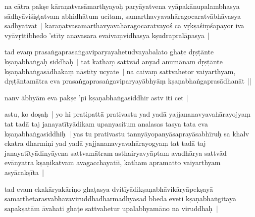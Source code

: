 \documentclass[article,12pt,a4paper]{memoir}%
\newcounter{parCount}
\begin{document}
	  
	  \pstart \leavevmode%
	\label{thakur75-69.24}na cātra pakṣe kāraṇatvasāmarthyayoḥ paryāyatvena vyāpakānupalambhasya sādhyāviśiṣṭatvam abhidhātum ucitam, samarthavyavahāragocaratvābhāvasya sādhyatvāt | kāraṇatvasamarthavyavahāragocaratvayoś ca vṛkṣaśiṃśapayor iva vyāvṛttibhedo 'stīty anavasara evaivaṃvidhasya kṣudrapralāpasya |
	{}
	\pend%
      

	  
	  \pstart \leavevmode%
	\label{thakur75-69.28}tad evaṃ prasaṅgaprasaṅgaviparyayahetudvayabalato ghaṭe dṛṣṭānte kṣaṇabhaṅgaḥ siddhaḥ | tat kathaṃ sattvād anyad anumānam dṛṣṭānte kṣaṇabhaṅgasādhakaṃ nāstīty ucyate | na caivaṃ sattvahetor vaiyarthyam, dṛṣṭāntamātra eva prasaṅgaprasaṅgaviparyayābhyāṃ kṣaṇabhaṅgaprasādhanāt ||
	{}
	\pend%
      

	  
	  \pstart \leavevmode%
	\label{thakur75-70.1}nanv ābhyām eva pakṣe 'pi kṣaṇabhaṅgasiddhir astv iti cet | 
	{}
	\pend%
      

	  
	  \pstart \leavevmode%
	\label{thakur75-70.1a}astu, ko doṣaḥ | yo hi pratipattā prativastu yad yadā yajjananavyavahārayojyaṃ tat tadā taj janayatītyādikam upanyasitum analasas tasya tata eva kṣaṇabhaṅgasiddhiḥ | yas tu prativastu tannyāyopanyāsaprayāsabhīruḥ sa khalv ekatra dharmiṇi yad yadā yajjananavyavahārayogyaṃ tat tadā taj janayatītyādinyāyena sattvamātram asthairyavyāptam avadhārya sattvād evānyatra kṣaṇikatvam avagacchayatīi, katham apramatto vaiyarthyam asyācakṣīta |
	{}
	\pend%
      

	  
	  \pstart \leavevmode%
	\label{thakur75-70.6}tad evam ekakāryakāriṇo ghaṭasya dvitīyādikṣaṇabhāvikāryāpekṣayā samarthetarasvabhāvaviruddhadharmādhyāsād bheda eveti kṣaṇabhaṅgitayā sapakṣatām āvahati ghaṭe sattvahetur upalabhyamāno na viruddhaḥ | 
	{}
	\pend%
      
\end{document}
